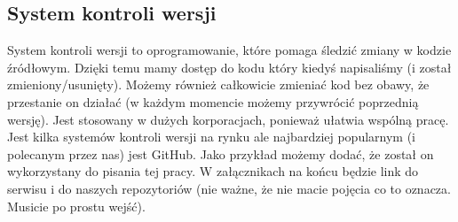 \documentclass[a4paper,12pt, twoside]{article}
\begin{document}
\subsection{System kontroli wersji}
System kontroli wersji to oprogramowanie, które pomaga śledzić zmiany w kodzie źródłowym.
Dzięki temu mamy dostęp do kodu który kiedyś napisaliśmy (i został zmieniony/usunięty). Możemy również całkowicie zmieniać kod bez obawy, że przestanie on działać (w każdym momencie możemy przywrócić poprzednią wersję). Jest stosowany w dużych korporacjach, ponieważ ułatwia wspólną pracę. Jest kilka systemów kontroli wersji na rynku ale najbardziej popularnym (i polecanym przez nas) jest GitHub. Jako przykład możemy dodać, że został on wykorzystany do pisania tej pracy. W załącznikach na końcu będzie link do serwisu i do naszych repozytoriów (nie ważne, że nie macie pojęcia co to oznacza. Musicie po prostu wejść).
\cite{SKW-Wiki, Git-Wiki}
\subsection{}



\newpage
 

\end{document}
